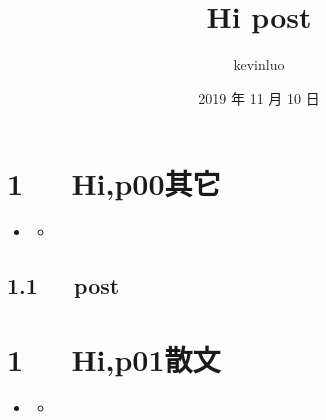 \documentclass[letterpaper,12pt,english]{sphinxmanual}
\title{Hi post}
\date{2019 年 11 月 10 日}
\author{kevinluo}
\begin{document}
\pagestyle{empty}
\sphinxmaketitle
\pagestyle{plain}
\sphinxtableofcontents
\pagestyle{normal}
\label{\detokenize{index::doc}}



\chapter{1   Hi,p00其它}
\label{\detokenize{p00_u5176_u5b83/Hello_uff0cp00_u5176_u5b83:hi-p00}}\label{\detokenize{p00_u5176_u5b83/Hello_uff0cp00_u5176_u5b83::doc}}
\begin{sphinxShadowBox}
\begin{itemize}
\item {} 
\label{\detokenize{p00_u5176_u5b83/Hello_uff0cp00_u5176_u5b83:id2}}{\hyperref[\detokenize{p00_u5176_u5b83/Hello_uff0cp00_u5176_u5b83:hi-p00}]{}}
\begin{itemize}
\item {} 
\label{\detokenize{p00_u5176_u5b83/Hello_uff0cp00_u5176_u5b83:id3}}{\hyperref[\detokenize{p00_u5176_u5b83/Hello_uff0cp00_u5176_u5b83:post}]{}}

\end{itemize}

\end{itemize}
\end{sphinxShadowBox}


\section{1.1   post}
\label{\detokenize{p00_u5176_u5b83/Hello_uff0cp00_u5176_u5b83:post}}

\chapter{1   Hi,p01散文}
\label{\detokenize{p01_u6563_u6587/Hello_uff0cp01_u6563_u6587:hi-p01}}\label{\detokenize{p01_u6563_u6587/Hello_uff0cp01_u6563_u6587::doc}}
\begin{sphinxShadowBox}
\begin{itemize}
\item {} 
\label{\detokenize{p01_u6563_u6587/Hello_uff0cp01_u6563_u6587:id2}}{\hyperref[\detokenize{p01_u6563_u6587/Hello_uff0cp01_u6563_u6587:hi-p01}]{}}
\begin{itemize}
\item {} 
\label{\detokenize{p01_u6563_u6587/Hello_uff0cp01_u6563_u6587:id3}}{\hyperref[\detokenize{p01_u6563_u6587/Hello_uff0cp01_u6563_u6587:post}]{}}

\end{itemize}

\end{itemize}
\end{sphinxShadowBox}
\end{document}
